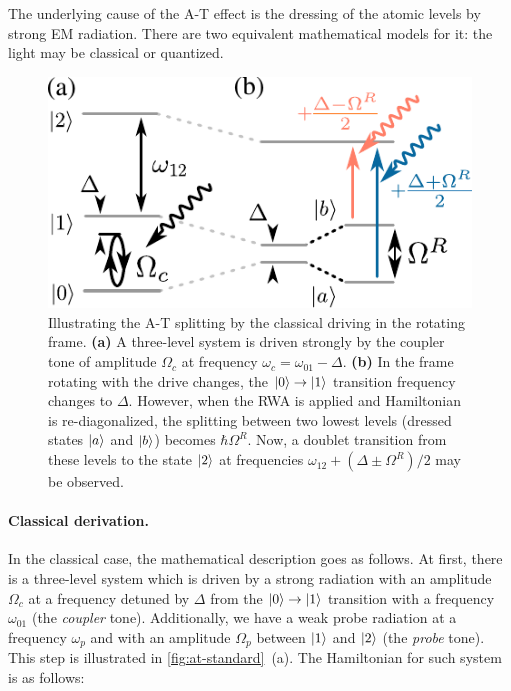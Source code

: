 \documentclass[%
 pra,
 amsmath,amssymb,
 reprint,%
]{revtex4-1}
\begin{document}
The underlying cause of the A-T effect is the dressing of the atomic levels by strong EM radiation. There are two equivalent mathematical models for it: the light may be classical or quantized.

\begin{figure}[b]	
	\includegraphics[width=\linewidth]{intro_scheme}
	\caption{Illustrating the A-T splitting by  the classical driving in the rotating frame. \textbf{(a)} A three-level system is driven strongly by the coupler tone of amplitude $\Omega_c$ at frequency $\omega_c = \omega_{01}-\Delta$. \textbf{(b)} In the frame rotating with the drive changes, the $\ket{0}\rightarrow \ket{1}$ transition frequency changes to $\Delta$. However, when the RWA is applied and Hamiltonian is re-diagonalized, the splitting between two lowest levels (dressed states $\ket{a}$ and $\ket{b}$) becomes $\hbar \Omega^R$. Now, a doublet transition from these levels to the state $\ket{2}$ at frequencies $\omega_{12}+(\Delta \pm \Omega^R)/2$ may be observed.} 
	\label{fig:at-standard}
\end{figure}

\paragraph{Classical derivation.} In the classical case, the mathematical description goes as follows. At first, there is a three-level system which is driven by a strong radiation with an amplitude $\Omega_c$ at a frequency detuned by $\Delta$ from the $\ket{0}\rightarrow \ket{1}$ transition with a frequency $\omega_{01}$ (the \textit{coupler} tone). Additionally, we have a weak probe radiation at a frequency $\omega_{p}$ and with an amplitude $\Omega_p$ between $\ket{1}$ and $\ket{2}$ (the \textit{probe} tone). This step is illustrated in \autoref{fig:at-standard}~(a). The Hamiltonian for such system is as follows:
\end{document}
